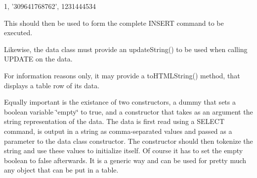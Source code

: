1, '309641768762', 1231444534\par


This should then be used to form the complete INSERT command to be executed.\begin{CompactItemize}
\item 
Likewise, the data class must provide an update\-String() to be used when calling UPDATE on the data.\item 
For information reasons only, it may provide a to\-HTMLString() method, that displays a table row of its data.\item 
Equally important is the existance of two constructors, a dummy that sets a boolean variable \char`\"{}empty\char`\"{} to true, and a constructor that takes as an argument the string representation of the data. The data is first read using a SELECT command, is output in a string as comma-separated values and passed as a parameter to the data class constructor. The constructor should then tokenize the string and use these values to initialize itself. Of course it has to set the empty boolean to false afterwards. It is a generic way and can be used for pretty much any object that can be put in a table. \end{CompactItemize}




